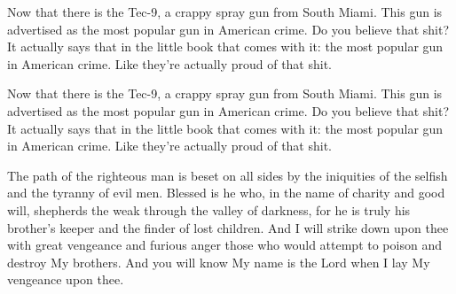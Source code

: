 \documentclass[11pt,twoside,a5paper,landscape,openright]{book}
\begin{document}
Now that there is the Tec-9, a crappy spray gun from South Miami. This gun is advertised as the most popular gun in American crime. Do you believe that shit? It actually says that in the little book that comes with it: the most popular gun in American crime. Like they're actually proud of that shit. 

Now that there is the Tec-9, a crappy spray gun from South Miami. This gun is advertised as the most popular gun in American crime. Do you believe that shit? It actually says that in the little book that comes with it: the most popular gun in American crime. Like they're actually proud of that shit. 

The path of the righteous man is beset on all sides by the iniquities of the selfish and the tyranny of evil men. Blessed is he who, in the name of charity and good will, shepherds the weak through the valley of darkness, for he is truly his brother's keeper and the finder of lost children. And I will strike down upon thee with great vengeance and furious anger those who would attempt to poison and destroy My brothers. And you will know My name is the Lord when I lay My vengeance upon thee.
\end{document}
